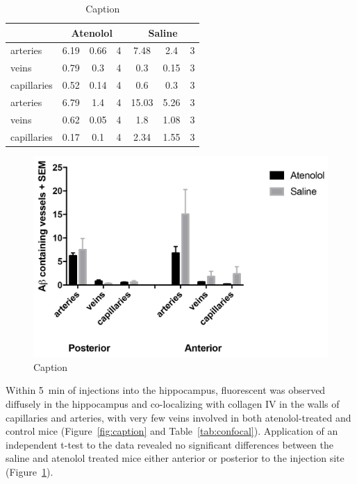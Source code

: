 \documentclass[a4paper,titlepage]{scrartcl}
\begin{document}
\begin{table}
  \center
  \caption{Caption\label{tab:caption}}
  \begin{tabular}{lcccccc}
    \toprule
     & \multicolumn{3}{c}{Atenolol} & \multicolumn{3}{c}{Saline}\\
    \midrule
    arteries    & 6.19 & 0.66 & 4 & 7.48  & 2.4  & 3\\
    veins       & 0.79 & 0.3  & 4 & 0.3   & 0.15 & 3\\
    capillaries & 0.52 & 0.14 & 4 & 0.6   & 0.3  & 3\\
    \midrule
    arteries    & 6.79 & 1.4  & 4 & 15.03 & 5.26 & 3\\
    veins       & 0.62 & 0.05 & 4 & 1.8   & 1.08 & 3\\
    capillaries & 0.17 & 0.1  & 4 & 2.34  & 1.55 & 3\\
    \bottomrule
  \end{tabular}
\end{table}

\begin{figure}
  \centerline{\includegraphics{figures/graph.png}}
  \caption{Caption\label{fig:graph}}
\end{figure}

Within \SI{5}{\minute} of injections into the hippocampus, fluorescent \Ab was observed diffusely in the hippocampus and co-localizing with collagen IV in the walls of capillaries and arteries, with very few veins involved in both atenolol-treated and control mice (Figure~\ref{fig:caption} and Table~\ref{tab:confocal}). Application of an independent t-test to the data revealed no significant differences between the saline and atenolol treated mice either anterior or posterior to the injection site (Figure~\ref{fig:graph}).
\end{document}
